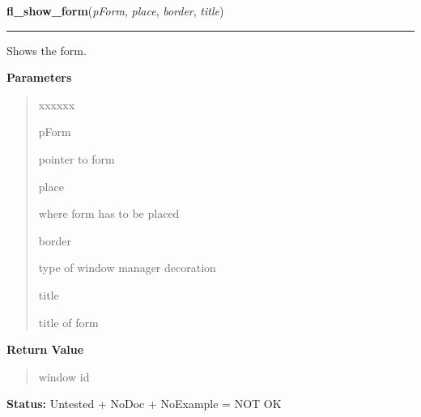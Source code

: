 \hspace{.8\funcindent}\begin{boxedminipage}{\funcwidth}

    \raggedright \textbf{fl\_show\_form}(\textit{pForm}, \textit{place}, \textit{border}, \textit{title})

    \vspace{-1.5ex}

    \rule{\textwidth}{0.5\fboxrule}
\setlength{\parskip}{2ex}
    Shows the form.

\setlength{\parskip}{1ex}
      \textbf{Parameters}
      \vspace{-1ex}

      \begin{quote}
        \begin{Ventry}{xxxxxx}

          \item[pForm]

          pointer to form

          \item[place]

          where form has to be placed

          \item[border]

          type of window manager decoration

          \item[title]

          title of form

        \end{Ventry}

      \end{quote}

      \textbf{Return Value}
    \vspace{-1ex}

      \begin{quote}
      window id

      \end{quote}

\textbf{Status:} Untested + NoDoc + NoExample = NOT OK



    \end{boxedminipage}

    \label{xformslib:library:fl_hide_form}

    \vspace{0.5ex}

